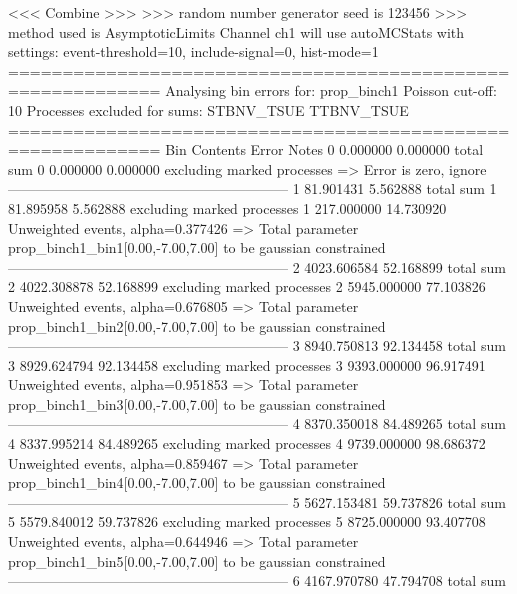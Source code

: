  <<< Combine >>> 
>>> random number generator seed is 123456
>>> method used is AsymptoticLimits
Channel ch1 will use autoMCStats with settings: event-threshold=10, include-signal=0, hist-mode=1
============================================================
Analysing bin errors for: prop_binch1
Poisson cut-off: 10
Processes excluded for sums: STBNV_TSUE TTBNV_TSUE
============================================================
Bin        Contents        Error           Notes                         
0          0.000000        0.000000        total sum                     
0          0.000000        0.000000        excluding marked processes    
  => Error is zero, ignore      
------------------------------------------------------------
1          81.901431       5.562888        total sum                     
1          81.895958       5.562888        excluding marked processes    
1          217.000000      14.730920       Unweighted events, alpha=0.377426
  => Total parameter prop_binch1_bin1[0.00,-7.00,7.00] to be gaussian constrained
------------------------------------------------------------
2          4023.606584     52.168899       total sum                     
2          4022.308878     52.168899       excluding marked processes    
2          5945.000000     77.103826       Unweighted events, alpha=0.676805
  => Total parameter prop_binch1_bin2[0.00,-7.00,7.00] to be gaussian constrained
------------------------------------------------------------
3          8940.750813     92.134458       total sum                     
3          8929.624794     92.134458       excluding marked processes    
3          9393.000000     96.917491       Unweighted events, alpha=0.951853
  => Total parameter prop_binch1_bin3[0.00,-7.00,7.00] to be gaussian constrained
------------------------------------------------------------
4          8370.350018     84.489265       total sum                     
4          8337.995214     84.489265       excluding marked processes    
4          9739.000000     98.686372       Unweighted events, alpha=0.859467
  => Total parameter prop_binch1_bin4[0.00,-7.00,7.00] to be gaussian constrained
------------------------------------------------------------
5          5627.153481     59.737826       total sum                     
5          5579.840012     59.737826       excluding marked processes    
5          8725.000000     93.407708       Unweighted events, alpha=0.644946
  => Total parameter prop_binch1_bin5[0.00,-7.00,7.00] to be gaussian constrained
------------------------------------------------------------
6          4167.970780     47.794708       total sum                     
